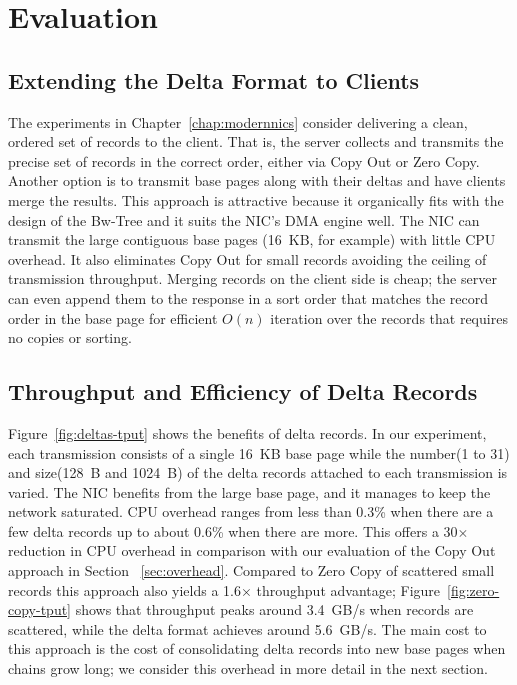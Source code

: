 



\section{Evaluation}

\subsection{Extending the Delta Format to Clients}


The experiments in Chapter~\ref{chap:modernnics} consider delivering a clean, ordered set of records to the
client. That is, the server collects and transmits the precise set of records
in the correct order, either via Copy Out or Zero Copy. Another option is to
transmit base pages along with their deltas and have clients merge the results.
This approach is attractive because it organically fits with the design of the
Bw-Tree and it suits the NIC's DMA engine well.  The NIC can transmit the
large contiguous base pages (16~KB, for example) with little CPU overhead.
It also eliminates Copy Out for small records avoiding the ceiling of transmission throughput. %
Merging records on the client side is cheap; the server can even append them to
the response in a sort order that matches the record order in the base page for
efficient $O(n)$ iteration over the records that requires no copies or sorting.


\subsection{Throughput and Efficiency of Delta Records}
\label{sec:delta-tput-efficiency}
Figure~\ref{fig:deltas-tput} shows the benefits of delta records. In our
experiment, each transmission consists of a single 16~KB base page while the
number(1 to 31) and size(128~B and 1024~B) of the delta records attached to each transmission is varied.
The NIC benefits from the large base page, and it manages to keep the network
saturated. CPU overhead ranges from less than 0.3\% when there are a few delta
records up to about 0.6\% when there are more. This offers a 30$\times$ reduction 
in CPU overhead in comparison with our evaluation of the Copy Out approach in 
Section ~\ref{sec:overhead}. Compared to Zero Copy of scattered
small records this approach also yields a 1.6$\times$ throughput advantage;
Figure~\ref{fig:zero-copy-tput} shows that throughput peaks around 3.4~GB/s when
records are scattered, while the delta format achieves around  5.6~GB/s. The main cost 
to this approach is the cost of consolidating delta records into new base pages 
when chains grow long; we consider this overhead in more detail in the next section.

